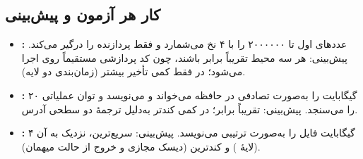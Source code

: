 \subsection{کار هر آزمون و پیش‌بینی}
\begin{itemize}
  \item \textbf{:} عدد‌های اول تا ۲۰۰۰۰۰۰ را با ۴ نخ می‌شمارد و فقط پردازنده را درگیر می‌کند. پیش‌بینی: هر سه محیط تقریباً برابر باشند، چون کد پردازشی مستقیماً روی  اجرا می‌شود؛ در  فقط کمی تأخیر بیشتر (زمان‌بندی دو لایه).
  \item \textbf{:} ۲۰ گیگابایت را به‌صورت تصادفی در حافظه می‌خواند و می‌نویسد و توان عملیاتی را می‌سنجد. پیش‌بینی: تقریباً برابر؛ در  کمی کندتر به‌دلیل ترجمهٔ دو سطحی آدرس.
  \item \textbf{:} ۴ گیگابایت فایل را به‌صورت ترتیبی می‌نویسد. پیش‌بینی:  سریع‌ترین،  نزدیک به آن (لایهٔ ) و  کندترین (دیسک مجازی و خروج از حالت میهمان).
\end{itemize}
